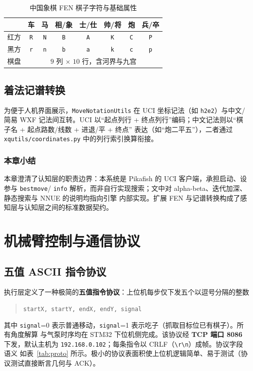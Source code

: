 \documentclass[UTF8, a4paper, 11pt, openany]{ctexbook}
\renewcommand{\_}{\textunderscore\allowbreak}
\begin{document}
\begin{table}[H]
\centering
\caption{中国象棋 FEN 棋子字符与基础属性}
\label{tab:fen}
\renewcommand{\arraystretch}{1.2}
\begin{tabular}{@{}lccccccc@{}}
\toprule
 & 车 & 马 & 相/象 & 士/仕 & 帅/将 & 炮 & 兵/卒 \\
\midrule
红方 & \texttt{R} & \texttt{N} & \texttt{B} & \texttt{A} & \texttt{K} & \texttt{C} & \texttt{P} \\
黑方 & \texttt{r} & \texttt{n} & \texttt{b} & \texttt{a} & \texttt{k} & \texttt{c} & \texttt{p} \\
棋盘 & \multicolumn{7}{c}{$9$ 列 $\times$ $10$ 行，含河界与九宫} \\
\bottomrule
\end{tabular}
\end{table}

\section{着法记谱转换}
为便于人机界面展示，\texttt{MoveNotationUtils} 在 UCI 坐标记法（如 \texttt{h2e2}）与中文/简易 WXF
记法间互转。UCI 以“起点列行 + 终点列行”编码；中文记法则以“棋子名 + 起点路数/线数 + 进退/平 + 终点”
表达（如“炮二平五”），二者通过 \texttt{xq\_utils/coordinates.py} 中的列行索引换算衔接。

\subsection*{本章小结}
本章澄清了认知层的职责边界：本系统是 Pikafish 的 UCI 客户端，承担启动、设参与 \texttt{bestmove}/
\texttt{info} 解析，而非自行实现搜索；文中对 alpha-beta、迭代加深、静态搜索与 NNUE 的说明均指向引擎
内部实现。扩展 FEN 与记谱转换构成了感知层与认知层之间的标准数据契约。

\chapter{机械臂控制与通信协议}
\label{ch:robot}

\section{五值 ASCII 指令协议}
\label{sec:proto}
执行层定义了一种极简的\textbf{五值指令协议}：上位机每步仅下发五个以逗号分隔的整数
\begin{quote}
\texttt{startX, startY, endX, endY, signal}
\end{quote}
其中 \texttt{signal}=0 表示普通移动，\texttt{signal}=1 表示吃子（抓取目标位已有棋子）。所有角度解算
与气泵时序均在 STM32 下位机侧完成。该协议经 \textbf{TCP 端口 8086} 下发，默认主机为
\texttt{192.168.0.102}；每条指令以 CRLF（\texttt{\textbackslash r\textbackslash n}）成帧。协议字段语义
如表~\ref{tab:proto} 所示。极小的协议表面积使上位机逻辑简单、易于测试（协议测试直接断言几何与 ACK）。
\end{document}
